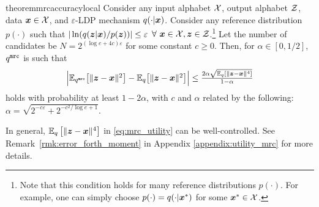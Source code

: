 \begin{restatable}{theorem}{mrcaccuracylocal}\label{theorem:mrc_accuracy_local}
Consider any input alphabet $\mathcal{X}$, output alphabet $\mathcal{Z}$, data ${\boldsymbol{x}} \in \mathcal{X}$, and $\varepsilon$-LDP mechanism $q(\cdot|{\boldsymbol{x}})$. Consider any reference distribution $p(\cdot)$ such that $| \ln (q({\boldsymbol{z}}|{\boldsymbol{x}}) / p({\boldsymbol{z}})) | \leq \varepsilon$ $\forall ~ {\boldsymbol{x}} \in \mathcal{X}, {\boldsymbol{z}} \in \mathcal{Z}$.\footnote{Note that this condition holds for many reference distributions $p(\cdot)$. For example, one can simply choose $p(\cdot) = q(\cdot|{\boldsymbol{x}}^*)$ for some ${\boldsymbol{x}}^* \in \mathcal{X}$.} Let the number of candidates be $N = 2^{(\log e + 4c) \varepsilon}$ for some constant $c \geq 0$. Then, for $\alpha \in [0,1/2]$, $q^{\texttt{mrc}}$ is such that 
\begin{align}\textstyle
     \Big| \mathbb{E}_{q^{\texttt{mrc}}}\big[\|{\boldsymbol{z}} - {\boldsymbol{x}}\|^2\big] - \mathbb{E}_{q}\big[\|{\boldsymbol{z}} - {\boldsymbol{x}}\|^2\big] \Big| \leq \frac{2\alpha \sqrt{\mathbb{E}_{q}[\|{\boldsymbol{z}} - {\boldsymbol{x}}\|^4]} }{1-\alpha}  \label{eq:mrc_utility}
 \end{align}
 holds with probability at least $1 - 2\alpha$, with $c$ and $\alpha$ related by the following: $\alpha = \sqrt{2^{-c\varepsilon} + 2^{-c^2/\log e + 1}}$.
\end{restatable}
In general, $\mathbb{E}_{q}\left[ \|{\boldsymbol{z}} - {\boldsymbol{x}}\|^4\right]$ in \eqref{eq:mrc_utility} can be well-controlled. See Remark~\ref{rmk:error_forth_moment} in Appendix \ref{appendix:utility_mrc} for more details.
\iffalse
\begin{remark}\label{rmk:error_forth_moment}
Note that for most $\varepsilon$-LDP mechanisms, $\Expectation_{q(\svbz|\svbx)}\lb \|\svbz - \svbx\|^4\rb$ can be well-controlled. For instance, for $\SubsetSelection$ and $\PrivUnit$, the output spaces are bounded, so $\sqrt{\Expectation_{q(\svbz|\svbx)}[\|\svbz - \svbx\|^4]}$ is of the same order as $\Expectation_{q(\svbz|\svbx)}\big[\|\svbz - \svbx\|^2\big]$. Therefore, by making $\alpha$ small enough (i.e. by increasing $c$), we can make the estimation error arbitrary small.
\end{remark}
\fi

